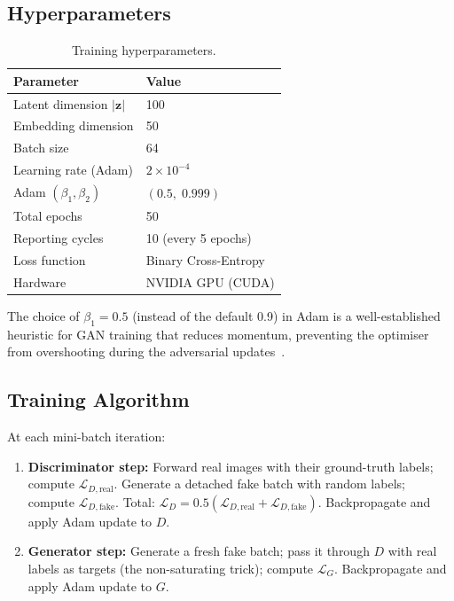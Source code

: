 \documentclass[conference]{IEEEtran}
\begin{document}
\subsection{Hyperparameters}
\begin{table}[h]
  \centering
  \caption{Training hyperparameters.}
  \label{tab:hyper}
  \begin{tabular}{ll}
    \toprule
    \textbf{Parameter} & \textbf{Value} \\
    \midrule
    Latent dimension $|\mathbf{z}|$ & 100 \\
    Embedding dimension & 50 \\
    Batch size & 64 \\
    Learning rate (Adam) & $2 \times 10^{-4}$ \\
    Adam $(\beta_1, \beta_2)$ & $(0.5,\; 0.999)$ \\
    Total epochs & 50 \\
    Reporting cycles & 10 (every 5 epochs) \\
    Loss function & Binary Cross-Entropy \\
    Hardware & NVIDIA GPU (CUDA) \\
    \bottomrule
  \end{tabular}
\end{table}

The choice of $\beta_1 = 0.5$ (instead of the default 0.9) in Adam is a well-established heuristic for GAN training that reduces momentum, preventing the optimiser from overshooting during the adversarial updates~\cite{radford2016}.

\subsection{Training Algorithm}
At each mini-batch iteration:
\begin{enumerate}
  \item \textbf{Discriminator step:} Forward real images with their ground-truth labels; compute $\mathcal{L}_{D,\text{real}}$. Generate a detached fake batch with random labels; compute $\mathcal{L}_{D,\text{fake}}$. Total: $\mathcal{L}_D = 0.5(\mathcal{L}_{D,\text{real}} + \mathcal{L}_{D,\text{fake}})$. Backpropagate and apply Adam update to $D$.
  \item \textbf{Generator step:} Generate a fresh fake batch; pass it through $D$ with real labels as targets (the non-saturating trick); compute $\mathcal{L}_G$. Backpropagate and apply Adam update to $G$.
\end{enumerate}
\end{document}
